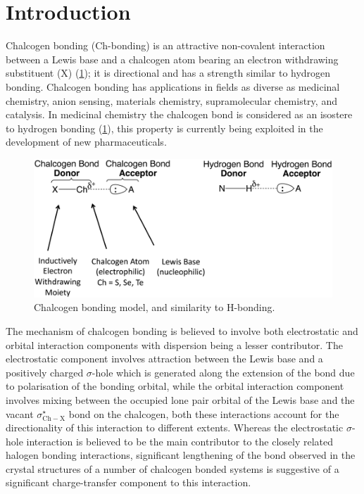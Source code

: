 \section{Introduction}
Chalcogen bonding (Ch-bonding) is an attractive non-covalent interaction between a Lewis base and a chalcogen atom bearing an electron withdrawing substituent (X) (\ref{fig:ch-bonding});\autocite{Vogel2019,Bleiholder2006,Garrett2015a} it is directional and has a strength similar to hydrogen bonding.
Chalcogen bonding has applications in fields as diverse as medicinal chemistry,\autocite{Beno2015,Clark2007,Hudson2016,Iwaoka2002,Reid2014} anion sensing,\autocite{Lim2017,Garrett2016,Borissov2019} materials chemistry,\autocite{Biot2018} supramolecular chemistry,\autocite{Chen2018,Ho2016,Gleiter2018,Bleiholder2006,Huynh2017,Gleiter2003} and catalysis.\autocite{Wang2020} 
In medicinal chemistry the chalcogen bond is considered as an isostere to  hydrogen bonding (\ref{fig:ch-bonding}), this property is currently being exploited in the development of new pharmaceuticals.

\begin{figure}
    \centering
    \includegraphics[width=0.8\linewidth]{Figures/ch-bonding.png}
    \caption{Chalcogen bonding model, and similarity to H-bonding.}
    \label{fig:ch-bonding}
\end{figure}

The mechanism of chalcogen bonding is believed to involve both electrostatic and orbital interaction components with dispersion being a lesser contributor.
The electrostatic component involves attraction between the Lewis base and a positively charged $\sigma$-hole which is generated along the extension of the  bond due to polarisation of the bonding orbital, while the orbital  interaction component involves mixing between the occupied lone pair orbital of the Lewis base and the vacant $\sigma^{\star}_{\mathrm{Ch-X}}$ bond on the chalcogen, both these interactions account for the directionality of this interaction to different extents. 
Whereas the electrostatic $\sigma$-hole interaction is believed to be the main contributor to the closely related halogen bonding interactions,\autocite{Prasang2009,Sarwar2010,Beale2013,Aakeroy2013,Goud2016,Stone2013} significant lengthening of the  bond observed in the crystal structures of a number of chalcogen bonded systems is suggestive of a significant charge-transfer component to this interaction.\autocite{Fellowes2019,Pascoe2017}

